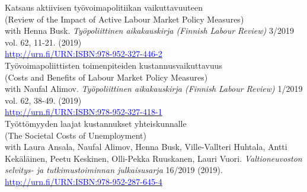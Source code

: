\documentclass[16pt]{article}
\begin{document}
\noindent Katsaus aktiivisen ty\"{o}voimapolitiikan vaikuttavuuteen \\
\noindent (Review of the Impact of Active Labour Market Policy Measures) \\
\noindent with Henna Busk. \textit{Ty\"{o}poliittinen aikakauskirja (Finnish Labour Review)} 3/2019 vol. 62, 11-21.  (2019) \\
\noindent \href{http://urn.fi/URN:ISBN:978-952-327-446-2}{\textcolor{blue}{http://urn.fi/URN:ISBN:978-952-327-446-2}} \\

\noindent Ty\"{o}voimapoliittisten toimenpiteiden kustannusvaikuttavuus \\
\noindent (Costs and Benefits of Labour Market Policy Measures) \\
\noindent with Naufal Alimov. \textit{Ty\"{o}poliittinen aikakauskirja (Finnish Labour Review)} 1/2019 vol. 62, 38-49.  (2019) \\
\noindent \href{http://urn.fi/URN:ISBN:978-952-287-645-4}{\textcolor{blue}{http://urn.fi/URN:ISBN:978-952-327-418-1}} \\

\noindent Ty\"{o}tt\"{o}myyden laajat kustannukset yhteiskunnalle \\
\noindent (The Societal Costs of Unemployment) \\
\noindent with Laura Ansala, Naufal Alimov, Henna Busk, Ville-Vallteri Huhtala, Antti Kek\"{a}l\"{a}inen, Peetu Keskinen, Olli-Pekka Ruuskanen, Lauri Vuori.  \textit{Valtioneuvoston selvitys- ja tutkimustoiminnan julkaisusarja} 16/2019 (2019). \href{http://urn.fi/URN:ISBN:978-952-287-645-4}{\textcolor{blue}{http://urn.fi/URN:ISBN:978-952-287-645-4}} \\




%
%
%
\end{document}
